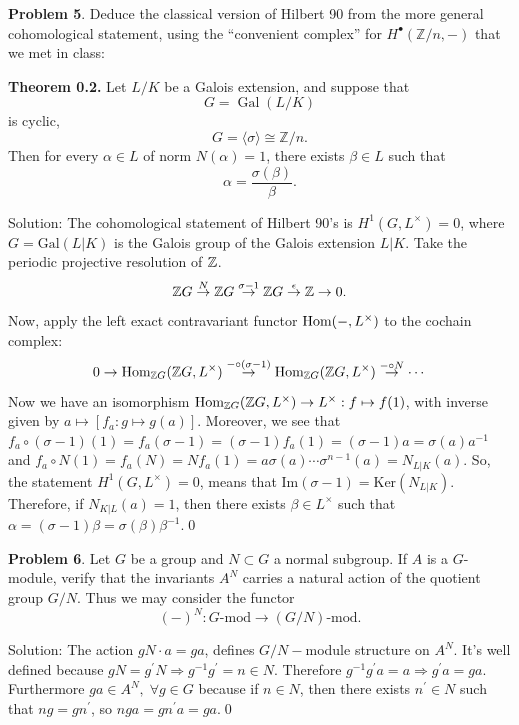 \begin{dang}
    \textbf{Problem 5}.
Deduce the classical version of Hilbert 90 from the more general
cohomological statement, using the ``convenient complex'' for
$H^\bullet(\mathbb{Z}/n,-)$ that we met in class:

\medskip

\noindent
\textbf{Theorem 0.2.}
Let $L/K$ be a Galois extension, and suppose that
\[
G = \operatorname{Gal}(L/K)
\]
is cyclic,
\[
G = \langle \sigma \rangle \cong \mathbb{Z}/n.
\]
Then for every $\alpha \in L$ of norm $N(\alpha)=1$, there exists
$\beta \in L$ such that
\[
\alpha = \frac{\sigma(\beta)}{\beta}.
\]
\end{dang}
Solution: The cohomological statement of Hilbert 90's is $H^1(G,L^\times)=0$, where $G=\text{Gal}(L|K)$ is the Galois 
group of the Galois extension $L|K$. Take the periodic projective resolution of $\mathbb{Z}$.
\begin{equation}
    \mathbb{Z} G\overset{N}{\to}\mathbb{Z} G \overset{\sigma-1}{\to}\mathbb{Z} G \overset{\epsilon}{\to}\mathbb{Z}\to0.
\end{equation}
Now, apply the left exact contravariant functor $\text{Hom}(-,L^\times)$ to the cochain complex:
\begin{equation}
    0\to \text{Hom}_{\mathbb{Z} G}(\mathbb{Z} G,L^\times)\overset{-\circ(\sigma-1)}{\to} \text{Hom}_{\mathbb{Z} G}(\mathbb{Z} G,L^\times)
    \overset{-\circ N}{\to}\cdots 
\end{equation}
Now we have an isomorphism $\text{Hom}_{\mathbb{Z} G}(\mathbb{Z} G,L^\times)\to L^\times: f\mapsto f(1)$, with inverse given by 
$a\mapsto [f_a:g\mapsto g(a)]$. Moreover, we see that 
$f_a\circ (\sigma-1)(1)=f_a(\sigma-1)=(\sigma - 1)f_a(1)=(\sigma-1)a=\sigma(a)a^{-1}$ and 
$f_a\circ N(1) = f_a(N)=Nf_a(1)=a\sigma(a)\cdots\sigma^{n-1}(a)=N_{L|K}(a)$. So, the statement $H^1(G,L^\times)=0$, means that 
$\text{Im}(\sigma-1)=\text{Ker}(N_{L|K})$. Therefore, if $N_{K|L}(a)=1$, then there exists $\beta\in L^\times$ 
such that $\alpha = (\sigma-1)\beta=\sigma(\beta)\beta^{-1}$.\qed
\begin{dang}
    \textbf{Problem 6}.
Let $G$ be a group and $N \subset G$ a normal subgroup. If $A$ is a
$G$-module, verify that the invariants $A^N$ carries a natural action
of the quotient group $G/N$. Thus we may consider the functor
\[
(-)^N :
G\text{-mod}
\longrightarrow
(G/N)\text{-mod}.
\]
\end{dang}
Solution: The action $gN\cdot a=ga$, defines $G/N-$module structure on $A^N$. It's well defined because 
$gN=g^\prime N\Rightarrow g^{-1}g^\prime = n\in N$. Therefore $g^{-1}g^\prime a = a\Rightarrow g^\prime a=ga$. Furthermore 
$ga\in A^N,\;\forall g\in G$ because if $n\in N$, then there exists 
$n^\prime\in N$ such that $ng = gn^\prime$, so $nga = gn^\prime a = ga$.\qed

